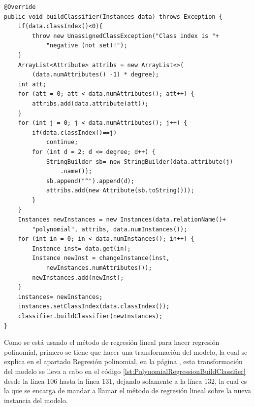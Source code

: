 \begin{lstlisting}[frame=single]  
@Override
public void buildClassifier(Instances data) throws Exception {
	if(data.classIndex()<0){
		throw new UnassignedClassException("Class index is "+
			"negative (not set)!");
	}
	ArrayList<Attribute> attribs = new ArrayList<>(
		(data.numAttributes() -1) * degree);
	int att;
	for (att = 0; att < data.numAttributes(); att++) {
		attribs.add(data.attribute(att));
	}
	for (int j = 0; j < data.numAttributes(); j++) {
		if(data.classIndex()==j)
			continue;
		for (int d = 2; d <= degree; d++) {
			StringBuilder sb= new StringBuilder(data.attribute(j)
				.name());
			sb.append("^").append(d);
			attribs.add(new Attribute(sb.toString()));
		}
	}
	Instances newInstances = new Instances(data.relationName()+
		"polynomial", attribs, data.numInstances());
	for (int in = 0; in < data.numInstances(); in++) {
		Instance inst= data.get(in);
		Instance newInst = changeInstance(inst, 
			newInstances.numAttributes());
		newInstances.add(newInst);
	}
	instances= newInstances;
	instances.setClassIndex(data.classIndex());
	classifier.buildClassifier(newInstances);
}
\end{lstlisting}

Como se está usando el método de regresión lineal para hacer regresión polinomial, primero se tiene que hacer una transformación del modelo, la cual se explica en el apartado Regresión polinomial, en la página \pageref{subsec:regresionPolinomial},
esta transformación del modelo se lleva a cabo en el código \ref{lst:PolynomialRegressionBuildClassifier} desde la línea 106 hasta la línea 131, dejando solamente a la línea 132, la cual es la que se encarga de mandar a llamar el método de regresión lineal sobre la nueva instancia del modelo.

